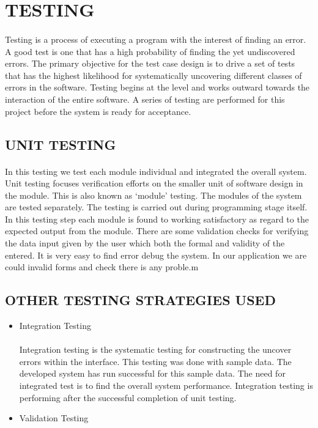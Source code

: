 \documentclass[a4paper, 12pt]{report}
\begin{document}
{{{{\section{TESTING}
\paragraph{}Testing is a process of executing a program with the interest of finding an error. A good
test is one that has a high probability of finding the yet undiscovered errors. The primary
objective for the test case design is to drive a set of tests that has the highest likelihood for
systematically uncovering different classes of errors in the software. Testing begins at the
level and works outward towards the interaction of the entire software. A series of testing are
performed for this project before the system is ready for acceptance.
\subsection{UNIT TESTING}
\paragraph{}In this testing we test each module individual and integrated the overall system. Unit
testing focuses verification efforts on the smaller unit of software design in the module. This
is also known as ‘module’ testing. The modules of the system are tested separately. The
testing is carried out during programming stage itself. In this testing step each module is
found to working satisfactory as regard to the expected output from the module. There are
some validation checks for verifying the data input given by the user which both the formal
and validity of the entered. It is very easy to find error debug the system. In our application
we are could invalid forms and check there is any proble.m
\subsection{OTHER TESTING STRATEGIES USED}
\begin{itemize}
\item Integration Testing
\paragraph{} Integration testing is the systematic testing for constructing the uncover errors within
the interface. This testing was done with sample data. The developed system has run
successful for this sample data. The need for integrated test is to find the overall system
performance. Integration testing is performing after the successful completion of unit testing.
\item Validation Testing

\end{itemize}}}}}
\end{document}
